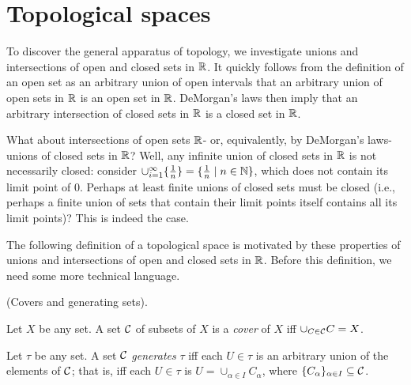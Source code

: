 \section{Topological spaces}

To discover the general apparatus of topology, we investigate unions and intersections of open and closed sets in $\mathbb{R}$. It quickly follows from the definition of an open set as an arbitrary union of open intervals that an arbitrary union of open sets in $\mathbb{R}$ is an open set in $\mathbb{R}$. DeMorgan's laws then imply that an arbitrary intersection of closed sets in $\mathbb{R}$ is a closed set in $\mathbb{R}$.

What about intersections of open sets $\mathbb{R}$- or, equivalently, by DeMorgan's laws- unions of closed sets in $\mathbb{R}$? Well, any infinite union of closed sets in $\mathbb{R}$ is not necessarily closed: consider $\cup_{i = 1}^\infty \{\frac{1}{n}\} = \{\frac{1}{n} \mid n \in \mathbb{N} \}$, which does not contain its limit point of $0$. Perhaps at least finite unions of closed sets must be closed (i.e., perhaps a finite union of sets that contain their limit points itself contains all its limit points)? This is indeed the case.

The following definition of a topological space is motivated by these properties of unions and intersections of open and closed sets in $\mathbb{R}$. Before this definition, we need some more technical language.


\newpage

\begin{defn}
    (Covers and generating sets).
    
    Let $X$ be any set. A set $\mathcal{C}$ of subsets of $X$ is a \textit{cover} of $X$ iff $\cup_{C \in \mathcal{C}} C = X$.
    
    Let $\tau$ be any set. A set $\mathcal{C}$ \textit{generates} $\tau$ iff each $U \in \tau$ is an arbitrary union of the elements of $\mathcal{C}$; that is, iff each $U \in \tau$ is $U = \cup_{\alpha \in I} C_\alpha$, where $\{C_\alpha\}_{\alpha \in I} \subseteq \mathcal{C}$.
\end{defn}

